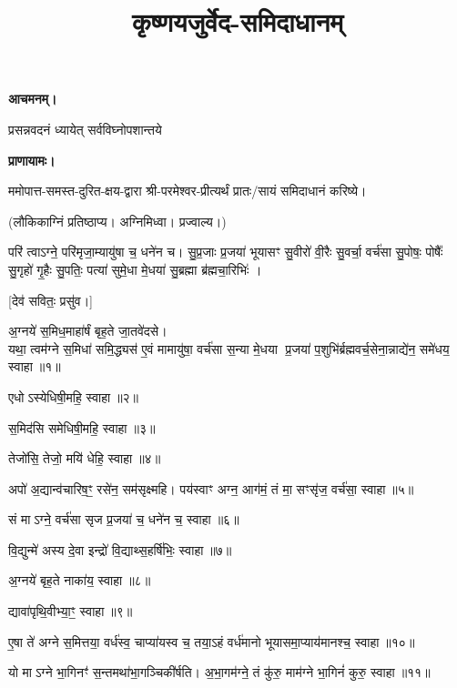 \setmainfont[Script=Devanagari,Mapping=tex-text,Mapping=devanagarinumerals,AutoFakeBold=2.0]{Siddhanta}
\title{\Huge कृष्णयजुर्वेद-समिदाधानम्}
\date{}
\maketitle
\tableofcontents 

\clearpage
{}

\textbf{आचमनम्।}

{प्रसन्नवदनं ध्यायेत् सर्वविघ्नोपशान्तये}
 
\textbf{प्राणायामः।} 

ममोपात्त-समस्त-दुरित-क्षय-द्वारा श्री-परमेश्वर-प्रीत्यर्थं प्रातः/सायं समिदाधानं करिष्ये।

(लौकिकाग्निं प्रतिष्ठाप्य। अग्निमिध्वा। प्रज्वाल्य।)

परि॑ त्वाऽग्ने॒ परि॑मृजा॒म्यायु॑षा च॒ धने॑न च। सु॒प्र॒जाः प्र॒जया॑ भूयासꣳ सु॒वीरो॑ वी॒रैः सु॒वर्चा॒ वर्च॑सा सु॒पोषः॒ पोषैः᳚ सु॒गृहो॑ गृ॒हैः सु॒पतिः॒ पत्या॑ सुमे॒धा मे॒धया॑ सु॒ब्रह्मा ब्र॑ह्मचा॒रिभिः॑ ।

[देव॑ सवितः॒ प्रसु॑व।]

अ॒ग्नये॑ स॒मिध॒माहा॑र्\mbox{}षं बृह॒ते जा॒तवे॑दसे।\\
यथा॒ त्वम॑ग्ने स॒मिधा॑ समि॒द्ध्यस॑ ए॒वं मामायु॑षा॒ वर्च॑सा स॒न्या मे॒धया प्र॒जया॑ प॒शुभि॑र्ब्रह्मवर्च॒सेना॒न्नाद्ये॑न॒ समे॑धय॒ स्वाहा॥१॥

एधोऽस्येधिषी॒महि॒ स्वाहा॥२॥

स॒मिद॑सि समेधिषी॒महि॒ स्वाहा॥३॥

तेजो॑सि॒ तेजो॒ मयि॑ धेहि॒ स्वाहा॥४॥

अपो॑ अ॒द्यान्व॑चारिष॒ꣳ॒ रसे॑न॒ सम॑सृक्ष्महि। पय॑स्वाꣳ अग्न॒ आग॑मं॒ तं मा॒ सꣳसृ॑ज॒ वर्च॑सा॒ स्वाहा॥५॥

सं माऽग्ने॒ वर्च॑सा सृज प्र॒जया॑ च॒ धने॑न च॒ स्वाहा॥६॥

वि॒द्युन्मे॑ अस्य दे॒वा इन्द्रो॑ वि॒द्याथ्स॒हर्\mbox{}षि॑भिः॒ स्वाहा॥७॥

अ॒ग्नये॑ बृह॒ते नाका॑य॒ स्वाहा॥८॥

द्यावा॑पृथि॒वीभ्या॒ꣳ॒ स्वाहा॥९॥

ए॒षा ते॑ अग्ने स॒मित्तया॒ वर्ध॑स्व॒ चाप्या॑यस्व च॒ तया॒ऽहं वर्ध॑मानो भूयासमा॒प्याय॑मानश्च॒ स्वाहा॥१०॥

यो माऽग्ने भा॒गिनꣳ॑ स॒न्तमथा॑भा॒गञ्चिकी॑र्\mbox{}षति। अ॒भा॒गम॑ग्ने॒ तं कु॑रु॒ माम॑ग्ने भा॒गिनं॑ कुरु॒ स्वाहा॥११॥

